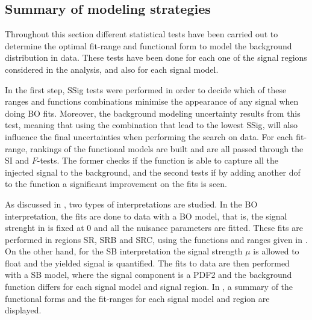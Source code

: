 \subsection{Summary of modeling strategies}
\label{subsec:bkg:modeling:strategy_summary}

Throughout this section different statistical tests have been carried out to determine the optimal fit-range and functional form to model the background distribution in data. These tests have been done for each one of the signal regions considered in the analysis, and also for each signal model.

In the first step, \ac{SSig} tests were performed in order to decide which of these ranges and functions combinations minimise the appearance of any signal when doing \ac{BO} fits. Moreover, the background modeling uncertainty results from this test, meaning that using the combination that lead to the lowest \ac{SSig}, will also influence the final uncertainties when performing the search on data. For each fit-range, rankings of the functional models are built and are all passed through the \ac{SI} and \(F\)-tests. The former checks if the function is able to capture all the injected signal to the background, and the second tests if by adding another \ac{dof} to the function a significant improvement on the fits is seen.

As discussed in \Sect{\ref{sec:strategy:stat_treatment:fits_results}}, two types of interpretations are studied. In the \ac{BO} interpretation, the fits are done to data with a \ac{BO} model, that is, the signal strenght in \Eqn{\ref{eq:strategy:stat_treatment:stat_model:likelihood}} is fixed at 0 and all the nuisance parameters are fitted. These fits are performed in regions SR, SRB and SRC, using the functions and ranges given in \Tab{\ref{tab:bkg:modeling:strategy_modeling:summary}}. On the other hand, for the \ac{SB} interpretation the signal strength \(\mu\) is allowed to float and the yielded signal is quantified. The fits to data are then performed with a \ac{SB} model, where the signal component is a \ac{PDF2} and the background function differs for each signal model and signal region. In \Tab{\ref{tab:bkg:modeling:strategy_modeling:summary}}, a summary of the functional forms and the fit-ranges for each signal model and region are displayed.


